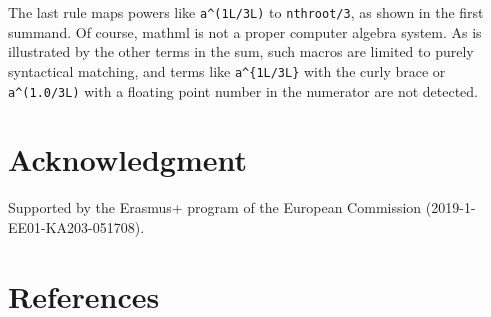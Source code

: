 The last rule maps powers like \texttt{a\^{}(1L/3L)} to \texttt{nthroot/3}, as shown in
the first summand. Of course, mathml is not a proper computer algebra
system. As is illustrated by the other terms in the sum, such macros are
limited to purely syntactical matching, and terms like \texttt{a\^{}\{1L/3L\}} with
the curly brace or \texttt{a\^{}(1.0/3L)} with a floating point number in the
numerator are not detected.

\hypertarget{acknowledgment}{%
\section{Acknowledgment}\label{acknowledgment}}

Supported by the Erasmus+ program of the European Commission
(2019-1-EE01-KA203-051708).

\hypertarget{references}{%
\section*{References}\label{references}}

